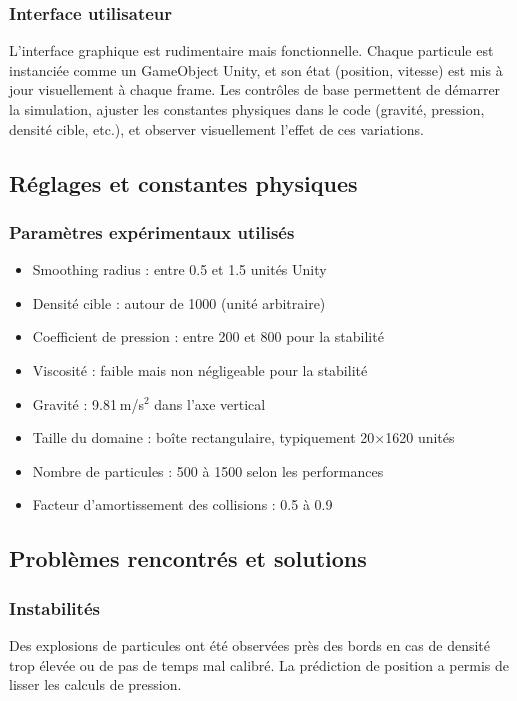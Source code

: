 \documentclass{article}
\begin{document}
\subsubsection{Interface utilisateur}

L’interface graphique est rudimentaire mais fonctionnelle. Chaque particule est instanciée comme un GameObject Unity, et son état (position, vitesse) est mis à jour visuellement à chaque frame. Les contrôles de base permettent de démarrer la simulation, ajuster les constantes physiques dans le code (gravité, pression, densité cible, etc.), et observer visuellement l’effet de ces variations.


\subsection{Réglages et constantes physiques}
\subsubsection{Paramètres expérimentaux utilisés}

\begin{itemize}
\item Smoothing radius : entre 0.5 et 1.5 unités Unity
\item Densité cible : autour de 1000 (unité arbitraire)
\item Coefficient de pression : entre 200 et 800 pour la stabilité
\item Viscosité : faible mais non négligeable pour la stabilité
\item Gravité : 9.81 m/s\(^2\) dans l’axe vertical
\item Taille du domaine : boîte rectangulaire, typiquement 20×1620 unités
\item Nombre de particules : 500 à 1500 selon les performances
\item Facteur d’amortissement des collisions : 0.5 à 0.9
\end{itemize}


\subsection{Problèmes rencontrés et solutions}
\subsubsection{Instabilités}
Des explosions de particules ont été observées près des bords en cas de densité trop élevée ou de pas de temps mal calibré. La prédiction de position a permis de lisser les calculs de pression.
\end{document}
